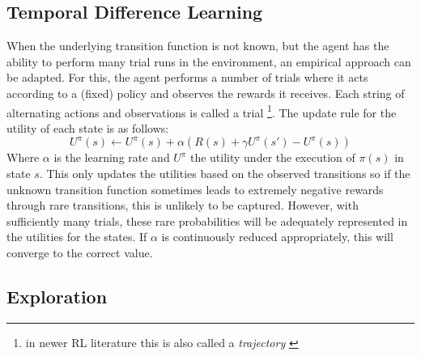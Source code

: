\subsection{Temporal Difference Learning}%
\label{sub:temporal_difference_learning}

When the underlying transition function is not known, but the agent has the ability to perform many trial runs in the
environment, an empirical approach can be adapted. For this, the agent performs a number of trials where it acts
according to a (fixed) policy and observes the rewards it receives. Each string of alternating actions and observations
is called a trial
\footnote{in newer \ac {RL} literature this is also called a \emph{trajectory} \citep{proximalpolicyopt, heess2017emergence} }. 
The update rule for the utility of each state is as follows:
\begin{equation}
U^\pi(s) \gets U^\pi(s) + \alpha(R(s) + \gamma U^\pi(s') - U^\pi(s))
\end{equation}
Where $\alpha$ is the learning rate and $U^\pi$ the utility under the execution of $\pi(s)$ in state $s$. This only
updates the utilities based on the observed transitions so if the unknown transition function sometimes leads to
extremely negative rewards through rare transitions, this is unlikely to be captured. However, with sufficiently many
trials, these rare probabilities will be adequately represented in the utilities for the states. If $\alpha$ is
continuously reduced appropriately, this will converge to the correct value. 

\subsection{Exploration}%
\label{sub:exploration}

